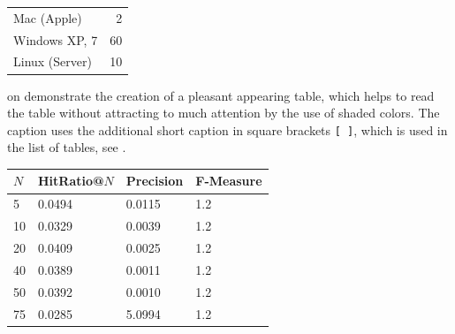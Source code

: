 \begin{table}[hb]
\centering
\small\renewcommand{\arraystretch}{1.4}  
\label{tab:Computers}
\begin{tabular}{lr}
\hline
Mac (Apple)    & 2  \\
Windows XP, 7  & 60 \\
Linux (Server) & 10 \\
\hline
\end{tabular}
\end{table}

 on  demonstrate the creation of a pleasant appearing table, which helps to read the table without attracting to much attention by the use of shaded colors. The caption uses the additional short caption in square brackets \texttt{[ ]}, which is used in the list of tables, see .

\begin{table}[ht]
\centering
\small\renewcommand{\arraystretch}{1.4}  
%
\label{results_jaccard}
%
\begin{tabularx}{0.5\textwidth}{lXXX}
\hline
\rowcolor{tableheadcolor}
$N$ & HitRatio@$N$ & Precision & F-Measure \\
\hline
5 & 0.0494 & 0.0115 & 1.2 \\
10 & 0.0329 & 0.0039 & 1.2 \\
20 &0.0409 & 0.0025 & 1.2 \\
40 & 0.0389 & 0.0011 & 1.2 \\
50 & 0.0392 & 0.0010 & 1.2 \\
75 & 0.0285 & 5.0994 & 1.2 \\
\hline
\end{tabularx}
\end{table}

